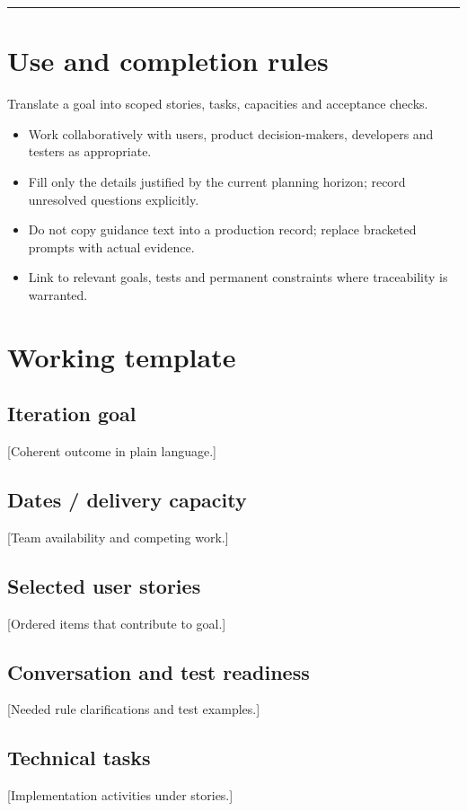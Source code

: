 \documentclass[11pt,letterpaper]{article}
\begin{document}
\tableofcontents\medskip\noindent\rule{\linewidth}{0.4pt}\medskip
\section{Use and completion rules}
Translate a goal into scoped stories, tasks, capacities and acceptance checks.

\begin{itemize}[leftmargin=*,itemsep=2pt]
\item Work collaboratively with users, product decision-makers, developers and testers as appropriate.
\item Fill only the details justified by the current planning horizon; record unresolved questions explicitly.
\item Do not copy guidance text into a production record; replace bracketed prompts with actual evidence.
\item Link to relevant goals, tests and permanent constraints where traceability is warranted.
\end{itemize}
\section{Working template}
\subsection{Iteration goal}
[Coherent outcome in plain language.]

\subsection{Dates / delivery capacity}
[Team availability and competing work.]

\subsection{Selected user stories}
[Ordered items that contribute to goal.]

\subsection{Conversation and test readiness}
[Needed rule clarifications and test examples.]

\subsection{Technical tasks}
[Implementation activities under stories.]
\end{document}
